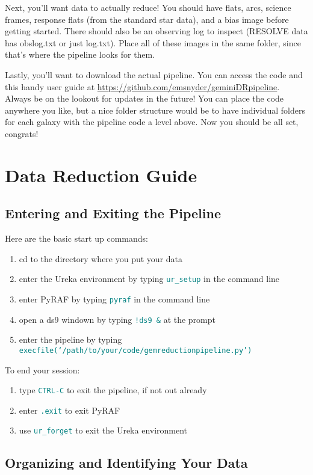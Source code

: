 \documentclass[12pt]{report}
\newcommand{\ty}[1]{\textcolor{teal}{\texttt{#1}}}
\begin{document}
Next, you'll want data to actually reduce! You should have flats, arcs, science frames, response flats (from the standard star data), and a bias image before getting started. There should also be an observing log to inspect (RESOLVE data has obslog.txt or just log.txt). Place all of these images in the same folder, since that's where the pipeline looks for them. 

Lastly, you'll want to download the actual pipeline. You can access the code and this handy user guide at \url{https://github.com/emsnyder/geminiDRpipeline}. Always be on the lookout for updates in the future! You can place the code anywhere you like, but a nice folder structure would be to have individual folders for each galaxy with the pipeline code a level above. Now you should be all set, congrats!

\chapter{Data Reduction Guide}

\section{Entering and Exiting the Pipeline}
Here are the basic start up commands: 
\begin{enumerate}
\item cd to the directory where you put your data
\item enter the Ureka environment by typing \ty{ur\_setup} in the command line 
\item enter PyRAF by typing \ty{pyraf} in the command line
\item open a ds9 windown by typing \ty{!ds9 \&} at the prompt
\item enter the pipeline by typing \ty{execfile(`/path/to/your/code/gemreductionpipeline.py')}
\end{enumerate}

\noindent To end your session:
\begin{enumerate}
\item type \ty{CTRL-C} to exit the pipeline, if not out already
\item enter \ty{.exit} to exit PyRAF
\item use \ty{ur\_forget} to exit the Ureka environment
\end{enumerate}

\section{Organizing and Identifying Your Data}
\end{document}

